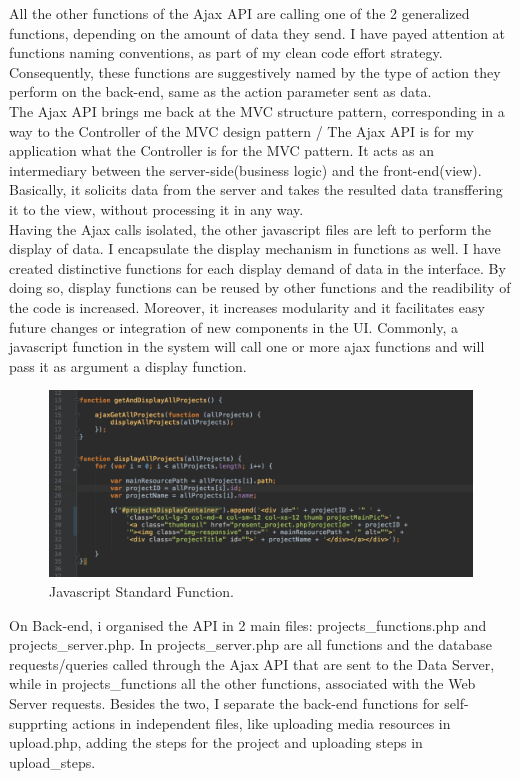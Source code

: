 All the other functions of the Ajax API are calling one of the 2 generalized functions, depending on the amount of data they send. 
I have payed attention at functions naming conventions, as part of my clean code effort strategy. Consequently, these functions are suggestively named by the type of action they perform on the back-end, same as the action parameter sent as data.\\

The Ajax API brings me back at the MVC structure pattern, corresponding in a way to the Controller of the MVC design pattern / The Ajax API is for my application what the Controller is for the MVC pattern. It acts as an intermediary between the server-side(business logic) and the front-end(view). Basically, it solicits data from the server and takes the resulted data transffering it to the view, without processing it in any way.\\  

Having the Ajax calls isolated, the other javascript files are left to perform the display of data. I encapsulate the display mechanism in functions as well. 
I have created distinctive functions for each display demand of data in the interface. By doing so, display functions can be reused by other functions and the readibility of the code is increased. Moreover, it increases modularity and it facilitates easy future changes or integration of new components in the UI.
Commonly, a javascript function in the system will call one or more ajax functions and will pass it as argument a display function.\\ 

\begin{figure}
\includegraphics[width=1\linewidth]{images/JavascriptFunction.png}
\caption{Javascript Standard Function.}
\label{fig:javascript_function}
\end{figure}


On Back-end, i organised the API in 2 main files: projects\_functions.php and projects\_server.php. In projects\_server.php are all functions and the database requests/queries called through the Ajax API that are sent to the Data Server, while in projects\_functions all the other functions, associated with the Web Server requests.
Besides the two, I separate the back-end functions for self-supprting actions in independent files, like uploading media resources in upload.php, adding the steps for the project and uploading steps in upload\_steps.

